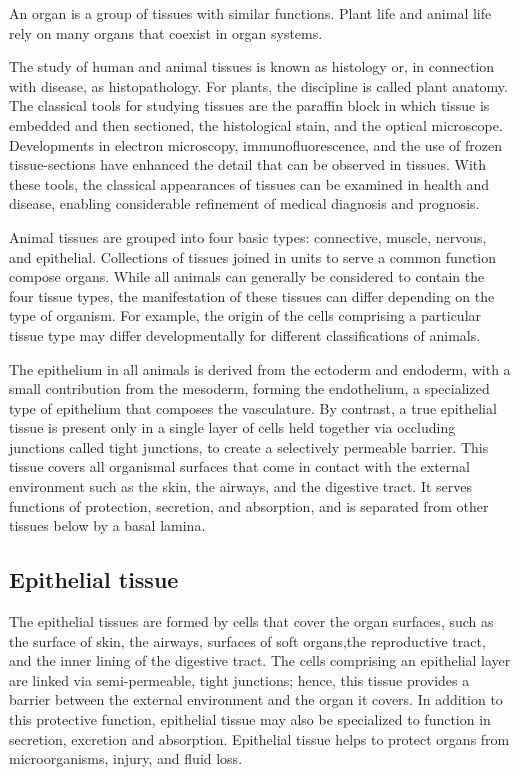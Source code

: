 An organ is a group of tissues with similar functions. Plant life and animal life rely on many organs that coexist in organ systems.

The study of human and animal tissues is known as histology or, in connection with disease, as histopathology. For plants, the discipline is called plant anatomy. The classical tools for studying tissues are the paraffin block in which tissue is embedded and then sectioned, the histological stain, and the optical microscope. Developments in electron microscopy, immunofluorescence, and the use of frozen tissue-sections have enhanced the detail that can be observed in tissues. With these tools, the classical appearances of tissues can be examined in health and disease, enabling considerable refinement of medical diagnosis and prognosis.

Animal tissues are grouped into four basic types: connective, muscle, nervous, and epithelial. Collections of tissues joined in units to serve a common function compose organs. While all animals can generally be considered to contain the four tissue types, the manifestation of these tissues can differ depending on the type of organism. For example, the origin of the cells comprising a particular tissue type may differ developmentally for different classifications of animals.

The epithelium in all animals is derived from the ectoderm and endoderm, with a small contribution from the mesoderm, forming the endothelium, a specialized type of epithelium that composes the vasculature. By contrast, a true epithelial tissue is present only in a single layer of cells held together via occluding junctions called tight junctions, to create a selectively permeable barrier. This tissue covers all organismal surfaces that come in contact with the external environment such as the skin, the airways, and the digestive tract. It serves functions of protection, secretion, and absorption, and is separated from other tissues below by a basal lamina.

\hypertarget{epithelial-tissue}{%
\subsection{Epithelial tissue}\label{epithelial-tissue}}

The epithelial tissues are formed by cells that cover the organ surfaces, such as the surface of skin, the airways, surfaces of soft organs,the reproductive tract, and the inner lining of the digestive tract. The cells comprising an epithelial layer are linked via semi-permeable, tight junctions; hence, this tissue provides a barrier between the external environment and the organ it covers. In addition to this protective function, epithelial tissue may also be specialized to function in secretion, excretion and absorption. Epithelial tissue helps to protect organs from microorganisms, injury, and fluid loss.

